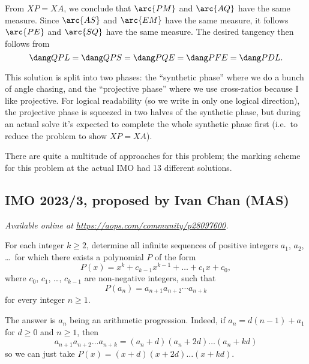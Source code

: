 \documentclass[11pt]{scrartcl}
\begin{document}
From $XP = XA$, we conclude that $\arc{PM}$ and $\arc{AQ}$ have the same measure.
Since $\arc{AS}$ and $\arc{EM}$ have the same measure,
it follows $\arc{PE}$ and $\arc{SQ}$ have the same measure.
The desired tangency then follows from
\[ \dang QPL = \dang QPS = \dang PQE = \dang PFE = \dang PDL. \]

\begin{remark*}
  This solution is split into two phases:
  the ``synthetic phase'' where we do a bunch of angle chasing, and the
  ``projective phase'' where we use cross-ratios because I like projective.
  For logical readability (so we write in only one logical direction),
  the projective phase is squeezed in two halves of the synthetic phase,
  but during an actual solve it's expected to complete
  the whole synthetic phase first (i.e.\ to reduce the problem to show $XP=XA$).
\end{remark*}

\begin{remark*}
  There are quite a multitude of approaches for this problem;
  the marking scheme for this problem at the actual IMO had 13 different solutions.
\end{remark*}
\pagebreak

\subsection{IMO 2023/3, proposed by Ivan Chan (MAS)}
\textsl{Available online at \url{https://aops.com/community/p28097600}.}
\begin{mdframed}[style=mdpurplebox,frametitle={Problem statement}]
For each integer $k\geq 2$, determine all infinite sequences of positive integers
$a_1$, $a_2$, \dots\ for which there exists a polynomial $P$ of the form
\[ P(x)=x^k+c_{k-1}x^{k-1}+\dots + c_1 x+c_0, \]
where $c_0$, $c_1$, \dots, $c_{k-1}$ are non-negative integers, such that
\[ P(a_n)=a_{n+1}a_{n+2}\dotsm a_{n+k} \]
for every integer $n\geq 1$.
\end{mdframed}
The answer is $a_n$ being an arithmetic progression.
Indeed, if $a_n = d(n-1) + a_1$ for $d \ge 0$ and $n \ge 1$, then
\[ a_{n+1} a_{n+2} \dots a_{n+k} = (a_n+d)(a_n+2d)\dots(a_n+kd) \]
so we can just take $P(x) = (x+d)(x+2d) \dots (x+kd)$.
\end{document}
